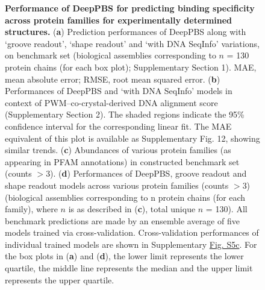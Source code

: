 \begin{center}
    \begin{figure}
        \caption[Performance of DeepPBS for predicting binding specificity across
protein families for experimentally determined structures.]{\textbf{Performance of DeepPBS for predicting binding specificity across
protein families for experimentally determined structures.} ({\bf a}) Prediction performances of DeepPBS along with ‘groove readout’, ‘shape readout’ and ‘with DNA SeqInfo’ variations, on benchmark set (biological assemblies corresponding to $n$ = 130 protein chains (for each box plot); Supplementary Section 1). MAE, mean absolute error; RMSE, root mean squared error. ({\bf b}) Performances of DeepPBS and ‘with DNA SeqInfo’ models in context of PWM–co-crystal-derived DNA alignment score (Supplementary Section 2). The shaded regions indicate
the 95\% confidence interval for the corresponding linear fit. The MAE equivalent of this plot is available as Supplementary Fig. 12, showing similar trends. ({\bf c}) Abundances of various protein families (as appearing in PFAM annotations) in constructed benchmark set (counts $>$3). ({\bf d}) Performances of DeepPBS, groove readout and shape readout models across various protein families (counts $>$3) (biological assemblies corresponding to n protein chains (for each family), where $n$ is as described in ({\bf c}), total unique $n$ = 130). All benchmark predictions are made by an ensemble average of five models trained via cross-validation. Cross-validation performances of individual trained models are shown in Supplementary \hyperref[fig:pdnaS5]{Fig. S5c}. For the box plots in ({\bf a}) and ({\bf d}), the lower limit represents the lower quartile, the middle line represents the median and the upper limit represents the upper quartile.}
  \label{fig:pdna2}
\end{figure}
\end{center}

